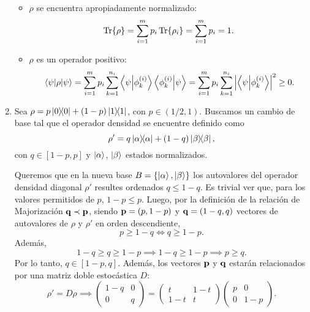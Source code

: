 \documentclass{scrartcl}
\DeclareRobustCommand{\[}{\begin{equation}}
\DeclareRobustCommand{\]}{\end{equation}}
\begin{document}
\begin{enumerate}
\begin{itemize}
        \item $\rho$ se encuentra apropiadamente normalizado:
        \[ \Tr{\rho} = \sum_{i = 1}^m p_i \Tr{\rho_i} = \sum_{i = 1}^m p_i = 1. \]
        
        \item $\rho$ es un operador positivo:
        \[ \mel{\psi}{\rho}{\psi} = \sum_{i = 1}^m p_i \sum_{k = 1}^{n_i} \ip{\psi}{\phi_k^{(i)}} \ip{\phi_k^{(i)}}{\psi} = \sum_{i = 1}^m p_i \sum_{k = 1}^{n_i} \abs{\ip{\psi}{\phi_k^{(i)}}}^2 \geq 0.  \]
    \end{itemize}
    
    
    
    \item Sea $\rho = p\dyad{0}{0} + (1 - p) \dyad{1}{1}$, con $p \in (1/2, 1)$. Buscamos un cambio de base tal que el operador densidad se encuentre definido como
    \[ \rho' = q\dyad{\alpha}{\alpha} + (1 - q) \dyad{\beta}{\beta}, \]
    con $q \in [1-p, p]$ y $\ket{\alpha}$, $\ket{\beta}$ estados normalizados.
    
    Queremos que en la nueva base $B = \{ \ket{\alpha}, \ket{\beta} \}$ los autovalores del operador densidad diagonal $\rho'$ resultes ordenados $q \leq 1 - q$. Es trivial ver que, para los valores permitidos de $p$, $1 - p \leq p$. Luego, por la definición de la relación de Majorización $\vb{q} \prec \vb{p}$, siendo $\vb{p} = (p, 1 - p)$ y $\vb{q} = (1 - q, q)$ vectores de autovalores de $\rho$ y $\rho'$ en orden descendiente,
    \[ p \geq 1 - q \iff q \geq 1 - p. \]
    Además,
    \[ 1 - q \geq q \geq 1 - p \implies 1 - q \geq 1 - p \implies p \geq q. \]
    Por lo tanto, $q \in [1 - p, q]$. Además, los vectores $\vb{p}$ y $\vb{q}$ estarán relacionados por una matriz doble estocástica $D$:
    \[
        \rho' = D \rho \implies
        \begin{pmatrix}
            1 - q & 0 \\
            0 & q
        \end{pmatrix}
        =
        \begin{pmatrix}
        t & 1 - t \\
        1 - t & t
        \end{pmatrix}
        \begin{pmatrix}
            p & 0 \\
            0 & 1 - p
        \end{pmatrix}.
    \]
    

\end{enumerate}
\end{document}
